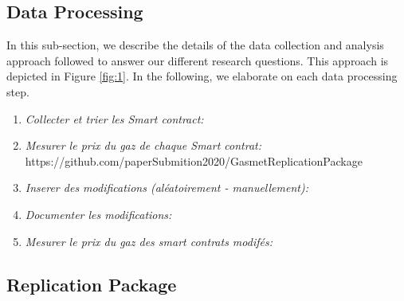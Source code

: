 \subsection{Data Processing}
\label{sec:Data Processing}
In this sub-section, we describe the details of the data collection and analysis approach followed to answer our different research questions. This approach is depicted in Figure \ref{fig:1}. In the following, we elaborate on each data processing step.



\begin{enumerate}

  \item \emph{Collecter et trier les Smart contract:}

  \item \emph{Mesurer le prix du gaz de chaque Smart contrat:}
        https://github.com/paperSubmition2020/GasmetReplicationPackage


  \item \emph{Inserer des modifications (aléatoirement - manuellement):}

  \item \emph{Documenter les modifications:}


  \item \emph{Mesurer le prix du gaz des smart contrats modifés:}

\end{enumerate}




\subsection{Replication Package}
\label{sec:Replication Package}
